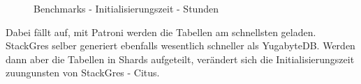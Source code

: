 \begin{flushleft}
\begin{figure}[H]
        \caption{Benchmarks - Initialisierungszeit - Stunden}
        \label{fig:initializing_time_hour}
    \end{figure}
    Dabei fällt auf, mit Patroni werden die Tabellen am schnellsten geladen.
    StackGres selber generiert ebenfalls wesentlich schneller als YugabyteDB.
    Werden dann aber die Tabellen in Shards aufgeteilt, verändert sich die Initialisierungszeit zuungunsten von StackGres - Citus.
\end{flushleft}

